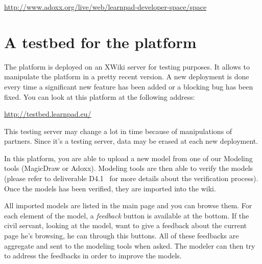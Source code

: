 \documentclass{learnpad}
\begin{document}
\url{http://www.adoxx.org/live/web/learnpad-developer-space/space}


\section{A testbed for the \learnpad platform}
\label{sec:testbed}

The \learnpad platform is deployed on an XWiki server for testing purposes.  It
allows to manipulate the platform in a pretty recent version.  A new deployment
is done every time a significant new feature has been added or a blocking bug
has been fixed.  You can look at this platform at the following address:

\url{http://testbed.learnpad.eu/}

This testing server may change a lot in time because of manipulations of
partners.  Since it's a testing server, data may be erased at each new
deployment.

In this platform, you are able to upload a new model from one of our Modeling
tools (MagicDraw or Adoxx).  Modeling tools are then able to verify the models
(please refer to deliverable D4.1~\cite{learnpad:D2.1} for more details about 
the verification process). Once the models has been verified, they are imported 
into the wiki.

All imported models are listed in the main page and you can browse them.  For
each element of the model, a \textit{feedback} button is available at the 
bottom. If the civil servant, looking at the model, want to give a feedback 
about the current page he's browsing, he can through this buttons.  All of 
these feedbacks are aggregate and sent to the modeling tools when asked.  The 
modeler can then try to address the feedbacks in order to improve the models.







 

\end{document}
